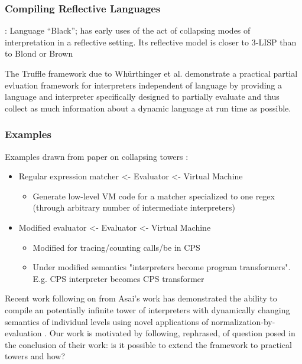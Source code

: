 \documentclass[fleqn]{article}
\theoremstyle{definition}
\begin{document}
\subsubsection{Compiling Reflective Languages}
\cite{asai1996duplication}: Language ``Black''; has early uses of the act of collapsing modes of interpretation in a reflective setting. Its reflective model is closer to 3-LISP than to Blond or Brown
\cite{asai2015compiling}

The Truffle framework due to Wh{\"u}rthinger et al. \cite{wurthinger2017practical} demonstrate a practical partial evluation framework for interpreters independent of language by providing a language and interpreter specifically designed to partially evaluate and thus collect as much information about a dynamic language at run time as possible.

\subsubsection{Examples}
Examples drawn from paper on collapsing towers \cite{amin2017collapsing}:
\begin{itemize}
	\item Regular expression matcher <- Evaluator <- Virtual Machine
	\begin{itemize}
		\item Generate low-level VM code for a matcher specialized to one regex (through arbitrary number of intermediate interpreters)
	\end{itemize}
	\item Modified evaluator <- Evaluator <- Virtual Machine
	\begin{itemize}
		\item Modified for tracing/counting calls/be in CPS
		\item Under modified semantics "interpreters become program transformers". E.g. CPS interpreter becomes CPS transformer
	\end{itemize}
\end{itemize}

Recent work following on from Asai's work has demonstrated the ability to compile an potentially infinite tower of interpreters with dynamically changing semantics of individual levels using novel applications of normalization-by-evaluation \cite{amin2017collapsing}. Our work is motivated by following, rephrased, of question posed in the conclusion of their work: is it possible to extend the framework to practical towers and how?
\end{document}
